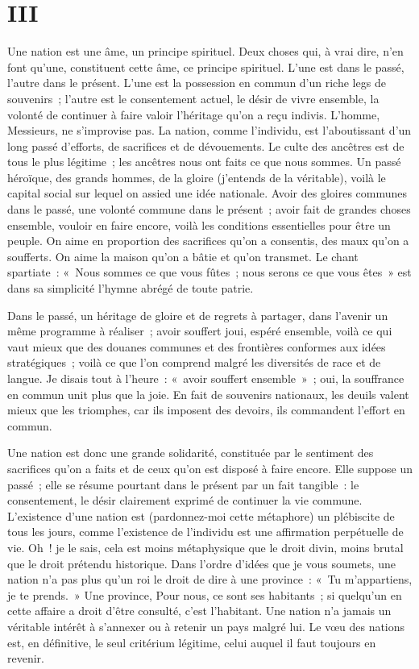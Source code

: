 \documentclass[french,twoside]{book} %
\newcommand\chapteropen{} %
\newcommand\chaptercont{} %
\begin{document}
\chapteropen
\chapter[{III}]{III}\renewcommand{\leftmark}{III}


\chaptercont
\noindent Une nation est une âme, un principe spirituel. Deux choses qui, à vrai dire, n’en font qu’une, constituent cette âme, ce principe spirituel. L’une est dans le passé, l’autre dans le présent. L’une est la possession en commun d’un riche legs de souvenirs ; l’autre est le consentement actuel, le désir de vivre ensemble, la volonté de continuer à faire valoir l’héritage qu’on a reçu indivis. L’homme, Messieurs, ne s’improvise pas. La nation, comme l’individu, est l’aboutissant d’un long passé d’efforts, de sacrifices et de dévouements. Le culte des ancêtres est de tous le plus légitime ; les ancêtres nous ont faits ce que nous sommes. Un passé héroïque, des grands hommes, de la gloire (j’entends de la véritable), voilà le capital social sur lequel on assied une idée nationale. Avoir des gloires communes dans le passé, une volonté commune dans le présent ; avoir fait de grandes choses ensemble, vouloir en faire encore, voilà les conditions essentielles pour être un peuple. On aime en proportion des sacrifices qu’on a consentis, des maux qu’on a soufferts. On aime la maison qu’on a bâtie et qu’on transmet. Le chant spartiate : « Nous sommes ce que vous fûtes ; nous serons ce que vous êtes » est dans sa simplicité l’hymne abrégé de toute patrie.\par
Dans le passé, un héritage de gloire et de regrets à partager, dans l’avenir un même programme à réaliser ; avoir souffert joui, espéré ensemble, voilà ce qui vaut mieux que des douanes communes et des frontières conformes aux idées stratégiques ; voilà ce que l’on comprend malgré les diversités de race et de langue. Je disais tout à l’heure : « avoir souffert ensemble » ; oui, la souffrance en commun unit plus que la joie. En fait de souvenirs nationaux, les deuils valent mieux que les triomphes, car ils imposent des devoirs, ils commandent l’effort en commun.\par
Une nation est donc une grande solidarité, constituée par le sentiment des sacrifices qu’on a faits et de ceux qu’on est disposé à faire encore. Elle suppose un passé ; elle se résume pourtant dans le présent par un fait tangible : le consentement, le désir clairement exprimé de continuer la vie commune. L’existence d’une nation est (pardonnez-moi cette métaphore) un plébiscite de tous les jours, comme l’existence de l’individu est une affirmation perpétuelle de vie. Oh ! je le sais, cela est moins métaphysique que le droit divin, moins brutal que le droit prétendu historique. Dans l’ordre d’idées que je vous soumets, une nation n’a pas plus qu’un roi le droit de dire à une province : « Tu m’appartiens, je te prends. » Une province, Pour nous, ce sont ses habitants ; si quelqu’un en cette affaire a droit d’être consulté, c’est l’habitant. Une nation n’a jamais un véritable intérêt à s’annexer ou à retenir un pays malgré lui. Le vœu des nations est, en définitive, le seul critérium légitime, celui auquel il faut toujours en revenir.\par
\end{document}
